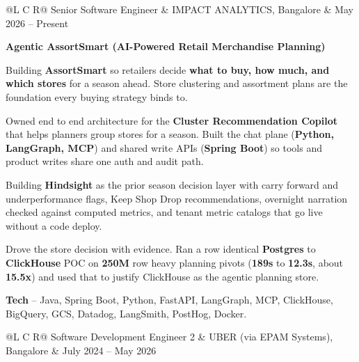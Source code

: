 
\noindent
\begin{tabularx}{\textwidth}{@{}L C R@{}}
\textcolor{role}{Senior Software Engineer} & \textcolor{company}{IMPACT ANALYTICS, Bangalore} & \textcolor{date}{May 2026 -- Present}\\
\end{tabularx}
\vspace{-2ex}

\textcolor{Project}{\textbf{Agentic AssortSmart (AI-Powered Retail Merchandise Planning)}}
\vspace{-1ex}
\begin{zitemize}
    \item Building \textbf{AssortSmart} so retailers decide \textbf{what to buy, how much, and which stores} for a season ahead. Store clustering and assortment plans are the foundation every buying strategy binds to.
    \item Owned end to end architecture for the \textbf{Cluster Recommendation Copilot} that helps planners group stores for a season. Built the chat plane (\textbf{Python, LangGraph, MCP}) and shared write APIs (\textbf{Spring Boot}) so tools and product writes share one auth and audit path.
    \item Building \textbf{Hindsight} as the prior season decision layer with carry forward and underperformance flags, Keep Shop Drop recommendations, overnight narration checked against computed metrics, and tenant metric catalogs that go live without a code deploy.
    \item Drove the store decision with evidence. Ran a row identical \textbf{Postgres} to \textbf{ClickHouse} POC on \textbf{250M} row heavy planning pivots (\textbf{189s} to \textbf{12.3s}, about \textbf{15.5x}) and used that to justify ClickHouse as the agentic planning store.
    \item \textbf{Tech} -- Java, Spring Boot, Python, FastAPI, LangGraph, MCP, ClickHouse, BigQuery, GCS, Datadog, LangSmith, PostHog, Docker.
\end{zitemize}

\vspace{0.5ex}
\noindent
\begin{tabularx}{\textwidth}{@{}L C R@{}}
\textcolor{role}{Software Development Engineer 2} & \textcolor{company}{UBER (via EPAM Systems), Bangalore} & \textcolor{date}{July 2024 -- May 2026}\\
\end{tabularx}
\vspace{-2ex}

